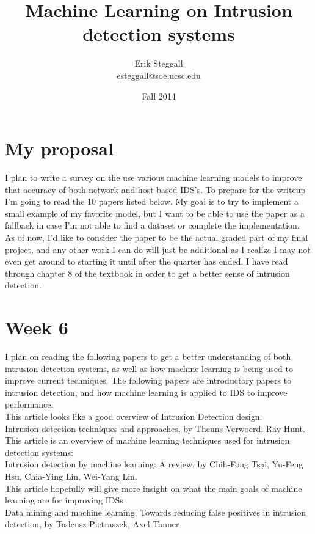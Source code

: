\documentclass{article}
\title{Machine Learning on Intrusion detection systems}
\author{Erik Steggall\\ esteggall@soe.ucsc.edu}
\date{Fall 2014}
\begin{document}
 \maketitle \pagestyle{empty}

\section*{My proposal}
I plan to write a survey on the use various machine learning models to improve that accuracy of both network and host based IDS's. To prepare for the writeup I'm going to read the 10 papers listed below. My goal is to try to implement a small example of my favorite model, but I want to be able to use the paper as a fallback in case I'm not able to find a dataset or complete the implementation.\\ 
As of now, I'd like to consider the paper to be the actual graded part of my final project, and any other work I can do will just be additional as I realize I may not even get around to starting it until after the quarter has ended. I have read through chapter 8 of the textbook in order to get a better sense of intrusion detection.\\

\section*{Week 6}
I plan on reading the following papers to get a better understanding of both intrusion detection systems, as well as how machine learning is being used to improve current techniques. The following papers are introductory papers to intrusion detection, and how machine learning is applied to IDS to improve performance:\\

This article looks like a good overview of Intrusion Detection design.\\
Intrusion detection techniques and approaches, by Theuns Verwoerd, Ray Hunt.\\

This article is an overview of machine learning techniques used for intrusion detection systems:\\
Intrusion detection by machine learning: A review, by Chih-Fong Tsai, Yu-Feng Hsu, Chia-Ying Lin, Wei-Yang Lin.\\

This article hopefully will give more insight on what the main goals of machine learning are for improving IDSs\\
Data mining and machine learning. Towards reducing false positives in intrusion detection, by Tadeusz Pietraszek, Axel Tanner\\
\end{document}
